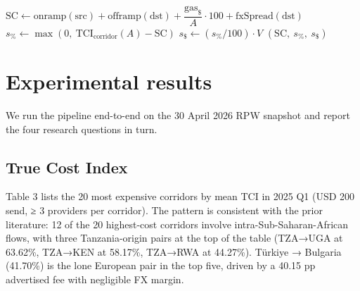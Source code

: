\documentclass[
  11pt,
]{article}
\begin{document}
\begin{algorithm}[h]
\caption{Stablecoin counterfactual per corridor, with savings rollup}
\begin{algorithmic}[1]
  \State $\text{SC} \gets \text{onramp}(\text{src}) + \text{offramp}(\text{dst}) + \dfrac{\text{gas}_\$}{A}\cdot 100 + \text{fxSpread}(\text{dst})$
  \State $s_\% \gets \max(0,\ \text{TCI}_{\text{corridor}}(A) - \text{SC})$
  \State $s_\$ \gets (s_\% / 100) \cdot V$
  \State \Return $(\text{SC},\ s_\%,\ s_\$)$
\EndProcedure
\end{algorithmic}
\end{algorithm}

\section{Experimental results}\label{experimental-results}

We run the pipeline end-to-end on the 30 April 2026 RPW snapshot and
report the four research questions in turn.

\subsection{True Cost Index}\label{true-cost-index-1}

Table 3 lists the 20 most expensive corridors by mean TCI in 2025 Q1
(USD 200 send, ≥ 3 providers per corridor). The pattern is consistent
with the prior literature: 12 of the 20 highest-cost corridors involve
intra-Sub-Saharan-African flows, with three Tanzania-origin pairs at the
top of the table (TZA→UGA at 63.62\%, TZA→KEN at 58.17\%, TZA→RWA at
44.27\%). Türkiye → Bulgaria (41.70\%) is the lone European pair in the
top five, driven by a 40.15 pp advertised fee with negligible FX margin.
\end{document}
